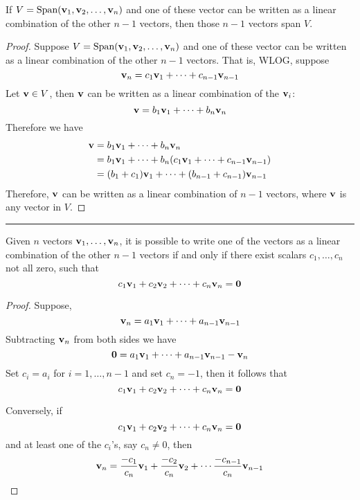  
\begin{theorem}
	If  $V = \text{Span}({\bf v}_1, {\bf v}_2, \dots, {\bf v}_n)$ and one of these vector can be written as a linear combination of the other $n-1$ vectors, then those $n-1$ vectors span $V$.
	
	\begin{proof}
		Suppose $V = \text{Span}({\bf v}_1, {\bf v}_2, \dots, {\bf v}_n)$ and one of these vector can be written as a linear combination of the other $n-1$ vectors.  That is, WLOG, suppose
		\[ {\bf v}_n = c_1 {\bf v}_1 + \cdots + c_{n-1}{\bf v}_{n-1} \]
		Let ${\bf v} \in V$, then ${\bf v}$ can be written as a linear combination of the ${\bf v}_i$:
		\[ {\bf v} = b_1 {\bf v}_1 + \cdots + b_n {\bf v}_n \]
		Therefore we have 
		\begin{align*}
			 {\bf v} &= b_1 {\bf v}_1 + \cdots + b_n {\bf v}_n\\
			 	&= b_1 {\bf v}_1 + \cdots + b_n ( c_1 {\bf v}_1 + \cdots + c_{n-1}{\bf v}_{n-1})\\
				&= (b_1+c_1){\bf v}_1 + \cdots +  (b_{n-1}+c_{n-1}){\bf v}_{n-1} 
		\end{align*}
		Therefore, ${\bf v}$ can be written as a linear combination of $n-1$ vectors, where ${\bf v}$ is any vector in $V$.
	\end{proof}
\end{theorem}
 
\rule[0.01in]{\textwidth}{0.0025in}


















\begin{theorem}
Given $n$ vectors ${\bf v}_1, \dots, {\bf v}_n$, it is possible to write one of the vectors as a linear combination of the other $n-1$ vectors if and only if there exist scalars $c_1, \dots, c_n$ not all zero, such that 
\[  c_1 {\bf v}_1 + c_2 {\bf v}_2 + \cdots + c_n {\bf v}_n = {\bf 0} \]


\begin{proof}
	Suppose, 
\[ {\bf v}_n = a_1 {\bf v}_1 + \cdots + a_{n-1}{\bf v}_{n-1} \]
Subtracting ${\bf v}_n$ from both sides we have
\[  {\bf 0} = a_1 {\bf v}_1 + \cdots + a_{n-1}{\bf v}_{n-1} -  {\bf v}_n \] 
Set $c_i = a_i$ for $i=1, \dots, n-1$ and set $c_n = -1$, then it follows that 
\[  c_1 {\bf v}_1 + c_2 {\bf v}_2 + \cdots + c_n {\bf v}_n = {\bf 0} \]

Conversely, if 
\[  c_1 {\bf v}_1 + c_2 {\bf v}_2 + \cdots + c_n {\bf v}_n = {\bf 0} \]
and at least one of the $c_i$'s, say $c_n \ne 0$, then
\[  {\bf v}_n =  \frac{-c_1}{c_n} {\bf v}_1 +  \frac{-c_2}{c_n}  {\bf v}_2 + \cdots   \frac{-c_{n-1}}{c_n} {\bf v}_{n-1}  \]


\end{proof}
\end{theorem}



